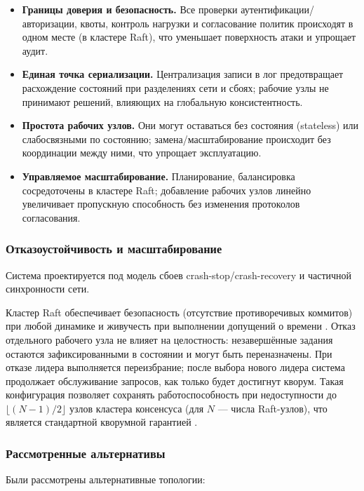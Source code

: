 \begin{itemize}
  \item \textbf{Границы доверия и безопасность.} Все проверки
  аутентификации/авторизации, квоты, контроль нагрузки и согласование политик
  происходят в одном месте (в кластере Raft), что уменьшает поверхность атаки и
  упрощает аудит.
  \item \textbf{Единая точка сериализации.} Централизация записи в лог
  предотвращает расхождение состояний при разделениях сети и сбоях; рабочие узлы не
  принимают решений, влияющих на глобальную консистентность.
  \item \textbf{Простота рабочих узлов.} Они могут оставаться без состояния
  (stateless) или слабосвязными по состоянию; замена/масштабирование происходит
  без координации между ними, что упрощает эксплуатацию.
  \item \textbf{Управляемое масштабирование.} Планирование, балансировка
  сосредоточены в кластере Raft; добавление рабочих узлов линейно увеличивает
  пропускную способность без изменения протоколов согласования.
\end{itemize}

\subsubsection{Отказоустойчивость и масштабирование}

Система проектируется под модель сбоев crash-stop/crash-recovery и частичной
синхронности сети.

Кластер Raft обеспечивает безопасность (отсутствие противоречивых коммитов) при
любой динамике и живучесть при выполнении допущений о времени
\cite{ongario2014}. Отказ отдельного рабочего узла не влияет на целостность:
незавершённые задания остаются зафиксированными в состоянии и могут быть
переназначены. При отказе лидера выполняется переизбрание; после выбора нового
лидера система продолжает обслуживание запросов, как только будет достигнут
кворум. Такая конфигурация позволяет сохранять работоспособность при
недоступности до $\lfloor (N-1)/2 \rfloor$ узлов кластера консенсуса (для $N$ —
числа Raft-узлов), что является стандартной кворумной гарантией
\cite{lynch1996}.

\subsubsection{Рассмотренные альтернативы}

Были рассмотрены альтернативные топологии:

